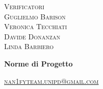 \documentclass[8pt]{article}
\begin{document}
\begin{titlepage}
\begin{minipage}[t]{0.47\textwidth}
  {\large{\textsc{Verificatori}}
   \vspace{3mm}
   {\\\large{\textsc{Guglielmo Barison}\\}}
   {\large{\textsc{Veronica Tecchiati}\\}} 
   {\large{\textsc{Davide Donanzan}\\}}
   {\large{\textsc{Linda Barbiero}\\}}

  }
 \end{minipage}


    \vspace{4cm}
	  \begin{center}
		\begin{flushright}
			{\fontsize{30pt}{52pt}\selectfont \textbf{Norme di Progetto\\}} %
		\end{flushright}
		\vspace{3cm}
	\end{center}
	\vspace{7.5cm}
    {\small \textsc{\href{mailto: nan1fyteam.unipd@gmail.com}{nan1fyteam.unipd@gmail.com}}}
\end{titlepage}
\pagestyle{mystyle}
\end{document}
